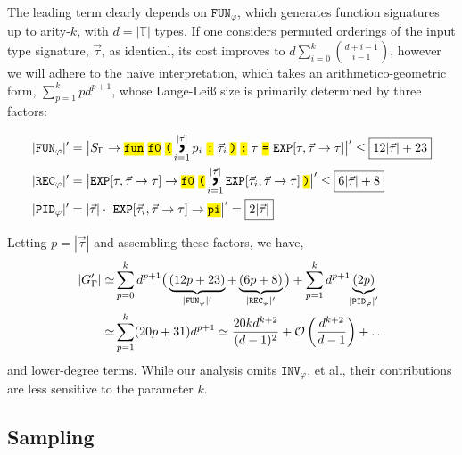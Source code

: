 \documentclass[sigplan,nonacm]{acmart}\settopmatter{printfolios=false,printccs=false,printacmref=false}
\begin{document}
  The leading term clearly depends on $\texttt{FUN}_\varphi$, which generates function signatures up to arity-$k$, with $d=|\mathbb{T}|$ types. If one considers permuted orderings of the input type signature, $\vec\tau$, as identical, its cost improves to $d\sum_{i = 0}^{k}{d+i - 1 \choose i-1}$, however we will adhere to the na\"ive interpretation, which takes an arithmetico-geometric form, $\sum_{p=1}^{k}pd^{p+1}$, whose Lange-Lei{\ss} size is primarily determined by three factors:\vspace{-0.1em}
  \begin{footnotesize}
  \begin{align*}
    |\texttt{FUN}_\varphi|' &= \big|S_\Gamma \rightarrow \tok{fun}\ \tok{f0}\ \tok{(}\cjoin{i=1}{|\vec\tau|}p_i\ \tok{:}\ \vec\tau_{i}\:\tok{)}\ \tok{:}\ \tau\ \tok{=}\ \texttt{EXP}[\tau, \vec\tau\rightarrow\tau]\big|'\leq\boxed{12|\vec\tau|+23}\\
    |\texttt{REC}_\varphi|' &= \big|\texttt{EXP}[\tau,\vec\tau \rightarrow \tau] \rightarrow \tok{f0}\ \tok{(}\cjoin{i=1}{|\vec\tau|}\texttt{EXP}[\vec\tau_{i}, \vec\tau\rightarrow\tau]\:\tok{)}\big|'\leq\boxed{6|\vec\tau| + 8}\\
    |\texttt{PID}_\varphi|' &= |\vec\tau|\cdot\big|\texttt{EXP}[\vec\tau_{i},\vec\tau \rightarrow \tau] \rightarrow \tok{pi}\big|' = \boxed{2|\vec\tau|}
  \end{align*}
  \end{footnotesize}
  Letting $p=|\vec\tau|$ and assembling these factors, we have,
  \begin{align*}
    |G_\Gamma'| \simeq &\sum_{p=0}^k d^{p+1}\big(\underbrace{(12p+23)}_{|\nt{FUN}_\varphi|'} + \underbrace{(6p+8)}_{|\nt{REC}_\varphi|'} \big) + \sum_{p=1}^k d^{p+1}\underbrace{(2p)}_{\mathclap{|\nt{PID}_\varphi|'}}\\
    \simeq &\sum_{p=1}^{k}(20p + 31)d^{p+1} \simeq  \frac{20kd^{k+2}}{(d-1)^2}+\mathcal{O}\left(\frac{d^{k+2}}{d-1}\right)+\ldots
  \end{align*}
  and lower-degree terms. While our analysis omits $\texttt{INV}_\varphi$, et al., their contributions are less sensitive to the parameter $k$.

  \subsection{Sampling}
\end{document}
